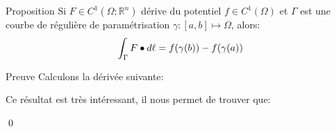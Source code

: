\documentclass[a4paper]{article}
\begin{document}
\begin{parag}{Proposition}
    Si $F \in C^{1}\left(\Omega; \mathbb{R}^n\right)$ dérive du potentiel $f \in C^{1}\left(\Omega\right)$ et $\Gamma$ est une courbe de régulière de paramétrisation $\gamma : \left[a, b\right] \mapsto \Omega$, alors: 
    \[\int_{\Gamma} F \dotprod d \ell = f\left(\gamma\left(b\right)\right) - f\left(\gamma\left(a\right)\right)\]
    
    \begin{subparag}{Preuve}
        Calculons la dérivée suivante: 
        
        Ce résultat est très intéressant, il nous permet de trouver que: 

        \qed
        
    \end{subparag}
\end{parag}
\end{document}
